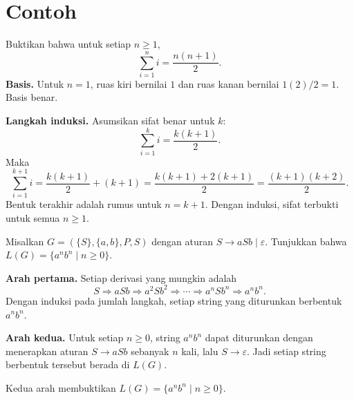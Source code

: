 \section*{Contoh}

\begin{contoh}
Buktikan bahwa untuk setiap \(n \ge 1\),
\[
\sum_{i=1}^{n} i = \frac{n(n+1)}{2}.
\]
\textbf{Basis.} Untuk \(n=1\), ruas kiri bernilai \(1\) dan ruas
kanan bernilai \(1(2)/2 = 1\). Basis benar.

\textbf{Langkah induksi.} Asumsikan sifat benar untuk \(k\):
\[
\sum_{i=1}^{k} i = \frac{k(k+1)}{2}.
\]
Maka
\[
\sum_{i=1}^{k+1} i
= \frac{k(k+1)}{2} + (k+1)
= \frac{k(k+1) + 2(k+1)}{2}
= \frac{(k+1)(k+2)}{2}.
\]
Bentuk terakhir adalah rumus untuk \(n = k+1\). Dengan induksi,
sifat terbukti untuk semua \(n \ge 1\).
\end{contoh}

\begin{contoh}
Misalkan \(G = (\{S\}, \{a,b\}, P, S)\) dengan aturan
\(S \to aSb \mid \varepsilon\). Tunjukkan bahwa
\(L(G) = \{a^n b^n \mid n \ge 0\}\).

\textbf{Arah pertama.} Setiap derivasi yang mungkin adalah
\[
S \Rightarrow aSb \Rightarrow a^2 S b^2 \Rightarrow \cdots
\Rightarrow a^n S b^n \Rightarrow a^n b^n.
\]
Dengan induksi pada jumlah langkah, setiap string yang diturunkan
berbentuk \(a^n b^n\).

\textbf{Arah kedua.} Untuk setiap \(n \ge 0\), string \(a^n b^n\)
dapat diturunkan dengan menerapkan aturan \(S \to aSb\) sebanyak
\(n\) kali, lalu \(S \to \varepsilon\). Jadi setiap string berbentuk
tersebut berada di \(L(G)\).

Kedua arah membuktikan \(L(G) = \{a^n b^n \mid n \ge 0\}\).
\end{contoh}

